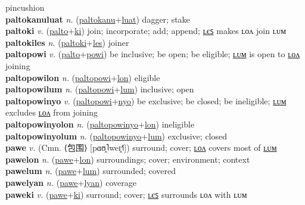 pincushion \label{paltokanulon} \\
\textbf{paltokanuluat} \textit{n.} (\hyperref[paltokanu]{paltokanu}+\hyperref[luat]{luat})
dagger; stake \label{paltokanuluat} \\
\textbf{paltoki} \textit{v.} (\hyperref[palto]{palto}+\hyperref[ki]{ki})
join; incorporate; add; append; \hyperref[paltokiles]{ʟєꜱ} makes ʟᴏᴧ join ʟᴜᴍ \label{paltoki} \\
\textbf{paltokiles} \textit{n.} (\hyperref[paltoki]{paltoki}+\hyperref[les]{les})
joiner \label{paltokiles} \\
\textbf{paltopowi} \textit{v.} (\hyperref[palto]{palto}+\hyperref[powi]{powi})
be inclusive; be open; be eligible; \hyperref[paltopowilum]{ʟᴜᴍ} is open to \hyperref[paltopowilon]{ʟᴏᴧ} joining \label{paltopowi} \\
\textbf{paltopowilon} \textit{n.} (\hyperref[paltopowi]{paltopowi}+\hyperref[lon]{lon})
eligible \label{paltopowilon} \\
\textbf{paltopowilum} \textit{n.} (\hyperref[paltopowi]{paltopowi}+\hyperref[lum]{lum})
inclusive; open \label{paltopowilum} \\
\textbf{paltopowinyo} \textit{v.} (\hyperref[paltopowi]{paltopowi}+\hyperref[nyo]{nyo})
be exclusive; be closed; be ineligible; \hyperref[paltopowinyolum]{ʟᴜᴍ} excludes \hyperref[paltopowinyolon]{ʟᴏᴧ} from joining \label{paltopowinyo} \\
\textbf{paltopowinyolon} \textit{n.} (\hyperref[paltopowinyo]{paltopowinyo}+\hyperref[lon]{lon})
ineligible \label{paltopowinyolon} \\
\textbf{paltopowinyolum} \textit{n.} (\hyperref[paltopowinyo]{paltopowinyo}+\hyperref[lum]{lum})
exclusive; closed \label{paltopowinyolum} \\
\textbf{pawe} \textit{v.} (Cmn. ⟨包围⟩ [pɑʊ̯˥weɪ̯˧˥])
surround; cover; \hyperref[pawelon]{ʟᴏᴧ} covers most of \hyperref[pawelum]{ʟᴜᴍ} \label{pawe} \\
\textbf{pawelon} \textit{n.} (\hyperref[pawe]{pawe}+\hyperref[lon]{lon})
surroundings; cover; environment; context \label{pawelon} \\
\textbf{pawelum} \textit{n.} (\hyperref[pawe]{pawe}+\hyperref[lum]{lum})
surrounded; covered \label{pawelum} \\
\textbf{pawelyan} \textit{n.} (\hyperref[pawe]{pawe}+\hyperref[lyan]{lyan})
coverage \label{pawelyan} \\
\textbf{paweki} \textit{v.} (\hyperref[pawe]{pawe}+\hyperref[ki]{ki})
surround; cover; \hyperref[pawekiles]{ʟєꜱ} surrounds ʟᴏᴧ with ʟᴜᴍ \label{paweki} \\
